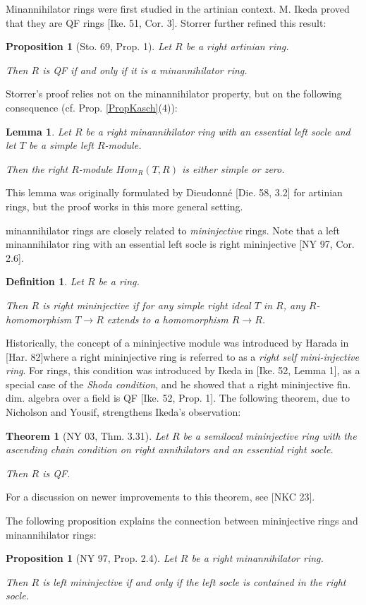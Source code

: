 \documentclass[11pt]{article}
\theoremstyle{plain}
\newtheorem{Lemma}[veta]{Lemma}
\newtheorem{Thm}[veta]{Theorem}
\newtheorem{Prop}[veta]{Proposition}
\newtheorem{Def}[veta]{Definition}
\theoremstyle{remark}
\theoremstyle{plain}
\begin{document}
\smallskip  

Minannihilator rings were first studied in the artinian context. M. Ikeda proved that they are QF rings [Ike. 51, Cor. 3]. Storrer further refined this result:
\begin{Prop}[Sto. 69, Prop. 1]\label{PropStorrer} 
Let $R$ be a right artinian ring.

Then $R$ is QF if and only if it is a minannihilator ring.     
\end{Prop}
Storrer's proof relies not on the minannihilator property, but on the following consequence (cf. Prop. \ref{PropKasch}(4)): 
\begin{Lemma}
    Let $R$ be a right minannihilator ring with an essential left socle and let $T$ be a simple left $R$-module.

    Then the right $R$-module $Hom_R(T, R)$ is either simple or zero.
\end{Lemma}
This lemma was originally formulated by Dieudonné [Die. 58, 3.2] for artinian rings, but the proof works in this more general setting. 

\smallskip 

minannihilator rings are closely related to \textit{mininjective} rings. Note that a left minannihilator ring with an essential left socle is right mininjective [NY 97, Cor. 2.6].
\begin{Def} Let $R$ be a ring.

Then $R$ is \emph{right mininjective} if for any simple right ideal $T$ in $R$, any $R$-homomorphism $T\to R$ extends to a homomorphism $R\to R$.
\end{Def}
Historically, the concept of a mininjective module was introduced by Harada in [Har. 82]where a right mininjective ring is referred to as a \textit{right self mini-injective ring}. For rings, this condition was introduced by Ikeda in [Ike. 52, Lemma 1], as a special case of the \textit{Shoda condition}, and he showed that a right mininjective fin. dim. algebra over a field is QF [Ike. 52, Prop. 1]. The following theorem, due to Nicholson and Yousif, strengthens Ikeda's observation:
\begin{Thm}[NY 03, Thm. 3.31]
    Let $R$ be a semilocal mininjective ring
with the ascending chain condition on right annihilators and an essential right socle. 

Then $R$ is QF.
\end{Thm}
For a discussion on newer improvements to this theorem, see [NKC 23].

The following proposition explains the connection between mininjective rings and minannihilator rings:
\begin{Prop}[NY 97, Prop. 2.4]\label{PropNY}  Let $R$ be a right minannihilator ring.

Then $R$ is left mininjective if and only if the left socle is contained in the right socle.    
\end{Prop}
\end{document}
